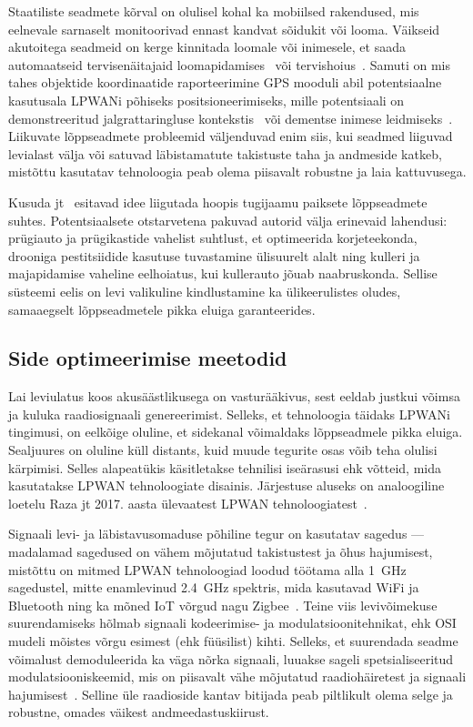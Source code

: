 \documentclass[12pt]{article}
\begin{document}
    Staatiliste seadmete kõrval on olulisel kohal ka mobiilsed rakendused, mis eelnevale sarnaselt monitoorivad ennast kandvat sõidukit või looma.
    Väikseid akutoitega seadmeid on kerge kinnitada loomale või inimesele, et saada automaatseid tervisenäitajaid loomapidamises~\cite{germani, liliu} või tervishoius~\cite{olatinwo, petajajarvi}.
    Samuti on mis tahes objektide koordinaatide raporteerimine GPS mooduli abil potentsiaalne kasutusala LPWANi põhiseks positsioneerimiseks, mille potentsiaali on demonstreeritud jalgrattaringluse kontekstis~\cite{kimpark} või dementse inimese leidmiseks~\cite{hadwen}.
    Liikuvate lõppseadmete probleemid väljenduvad enim siis, kui seadmed liiguvad levialast välja või satuvad läbistamatute takistuste taha ja andmeside katkeb, mistõttu kasutatav tehnoloogia peab olema piisavalt robustne ja laia kattuvusega.

    Kusuda jt~\cite{kusuda} esitavad idee liigutada hoopis tugijaamu paiksete lõppseadmete suhtes.
    Potentsiaalsete otstarvetena pakuvad autorid välja erinevaid lahendusi: prügiauto ja prügikastide vahelist suhtlust, et optimeerida korjeteekonda, drooniga pestitsiidide kasutuse tuvastamine ülisuurelt alalt ning kulleri ja majapidamise vaheline eelhoiatus, kui kullerauto jõuab naabruskonda.
    Sellise süsteemi eelis on levi valikuline kindlustamine ka ülikeerulistes oludes, samaaegselt lõppseadmetele pikka eluiga garanteerides.

    \subsection{Side optimeerimise meetodid}

    Lai leviulatus koos akusäästlikusega on vasturääkivus, sest eeldab justkui võimsa ja kuluka raadiosignaali genereerimist.
    Selleks, et tehnoloogia täidaks LPWANi tingimusi, on eelkõige oluline, et sidekanal võimaldaks lõppseadmele pikka eluiga.
    Sealjuures on oluline küll distants, kuid muude tegurite osas võib teha olulisi kärpimisi.
    Selles alapeatükis käsitletakse tehnilisi iseärasusi ehk võtteid, mida kasutatakse LPWAN tehnoloogiate disainis.
    Järjestuse aluseks on analoogiline loetelu Raza jt 2017. aasta ülevaatest LPWAN tehnoloogiatest~\cite{raza}.

    Signaali levi- ja läbistavusomaduse põhiline tegur on kasutatav sagedus — madalamad sagedused on vähem mõjutatud takistustest ja õhus hajumisest, mistõttu on mitmed LPWAN tehnoloogiad loodud töötama alla \SI{1}{\giga\hertz} sagedustel, mitte enamlevinud \SI{2,4}{\giga\hertz} spektris, mida kasutavad WiFi ja Bluetooth ning ka mõned IoT võrgud nagu Zigbee~\cite{bardyn}.
    Teine viis levivõimekuse suurendamiseks hõlmab signaali kodeerimise- ja modulatsioonitehnikat, ehk OSI mudeli mõistes võrgu esimest (ehk füüsilist) kihti. Selleks, et suurendada seadme võimalust demoduleerida ka väga nõrka signaali, luuakse sageli spetsialiseeritud modulatsiooniskeemid, mis on piisavalt vähe mõjutatud raadiohäiretest ja signaali hajumisest~\cite{reynders}.
    Selline üle raadioside kantav bitijada peab piltlikult olema selge ja robustne, omades väikest andmeedastuskiirust.
\end{document}
